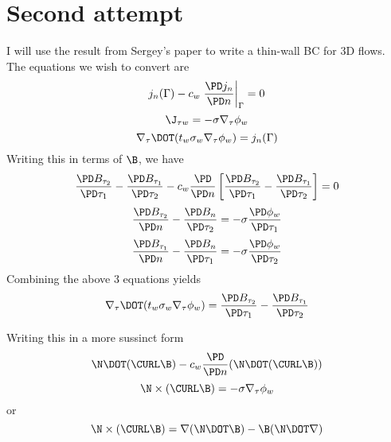 \documentclass[11pt]{article}
\begin{document}
\section{Second attempt}
I will use the result from Sergey's paper to write a thin-wall BC for 3D flows. The equations we wish to convert are
\begin{equation}
  j_n (\Gamma) -
  c_w
  \left. \frac{\PD j_n}{\PD n} \right|_{\Gamma} = 0
\end{equation}
\begin{equation}
  \J_{\tau w} = -\sigma \nabla_{\tau} \phi_w
\end{equation}
\begin{equation}
  \nabla_{\tau} \DOT (t_w \sigma_w \nabla_{\tau} \phi_w) = j_n(\Gamma)
\end{equation}
Writing this in terms of $\B$, we have
\begin{equation}
  \frac{\PD B_{\tau_2}}{\PD \tau_1} - \frac{\PD B_{\tau_1}}{\PD \tau_2}
  -
  c_w
  \frac{\PD}{\PD n}
  \left[
  \frac{\PD B_{\tau_2}}{\PD \tau_1} - \frac{\PD B_{\tau_1}}{\PD \tau_2}
  \right] = 0
\end{equation}
\begin{equation}
  \frac{\PD B_{\tau_2}}{\PD n} - \frac{\PD B_n}{\PD \tau_{2}} = -\sigma \frac{\PD \phi_w}{\PD \tau_1}
\end{equation}
\begin{equation}
  \frac{\PD B_{\tau_1}}{\PD n} - \frac{\PD B_n}{\PD \tau_{1}} = -\sigma \frac{\PD \phi_w}{\PD \tau_2}
\end{equation}
Combining the above 3 equations yields
\begin{equation}
  \nabla_{\tau} \DOT (t_w \sigma_w \nabla_{\tau} \phi_w) =
  \frac{\PD B_{\tau_2}}{\PD \tau_1} - \frac{\PD B_{\tau_1}}{\PD \tau_2}
\end{equation}

Writing this in a more sussinct form
\begin{equation}
  \N \DOT (\CURL \B) - c_w \frac{\PD }{\PD n} (\N \DOT (\CURL \B))
\end{equation}
\begin{equation}
  \N \times (\CURL \B) = - \sigma \nabla_{\tau} \phi_w
\end{equation}
or
\begin{equation}
  \N \times (\CURL \B) = \nabla (\N \DOT \B) - \B (\N \DOT \nabla)
\end{equation}
\end{document}

